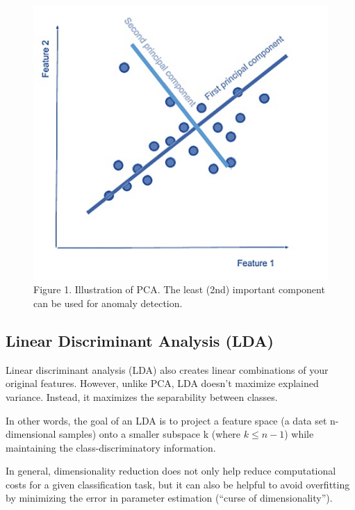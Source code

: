 \documentclass[
]{article}
\begin{document}
\begin{figure}

{\centering \includegraphics[width=6.44in]{img/w10-PCA} 

}

\caption{Figure 1. Illustration of PCA. The least (2nd) important component can be used for anomaly detection.}\label{fig:unnamed-chunk-1}
\end{figure}

\hypertarget{linear-discriminant-analysis-lda}{%
\subsection{Linear Discriminant Analysis
(LDA)}\label{linear-discriminant-analysis-lda}}

Linear discriminant analysis (LDA) also creates linear combinations of
your original features. However, unlike PCA, LDA doesn't maximize
explained variance. Instead, it maximizes the separability between
classes.

In other words, the goal of an LDA is to project a feature space (a data
set n-dimensional samples) onto a smaller subspace k (where
\(k \le n−1\)) while maintaining the class-discriminatory information.

In general, dimensionality reduction does not only help reduce
computational costs for a given classification task, but it can also be
helpful to avoid overfitting by minimizing the error in parameter
estimation (``curse of dimensionality'').
\end{document}
